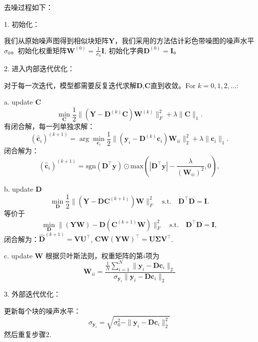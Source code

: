\documentclass[10pt,twocolumn,letterpaper]{article}
\begin{document}
去噪过程如下：

1. 初始化：

我们从原始噪声图得到相似块矩阵$\mathbf{Y}$，我们采用\cite{Chen2015ICCV}的方法估计彩色带噪图的噪声水平$\sigma_{0}$。初始化权重矩阵$\mathbf{W}^{(0)}=\frac{1}{\sigma_{0}}\mathbf{I}$, 初始化字典$\mathbf{D}^{(0)}=\mathbf{I}$。

2. 进入内部迭代优化：

对于每一次迭代，模型都需要反复迭代求解$\mathbf{D}$,$\mathbf{C}$直到收敛。For $k=0,1,2,...$:

a. update $\mathbf{C}$
\begin{equation}
\min_{\mathbf{C}}\frac{1}{2}\|(\mathbf{Y}-\mathbf{D}^{(k)}\mathbf{C})\mathbf{W}^{(k)}\|_{F}^{2}
+
\lambda\|\mathbf{C}\|_{1}.
\end{equation}
有闭合解，每一列单独求解：
\begin{equation}
(\hat{\mathbf{c}}_{i})^{(k+1)}
=
\arg\min_{\mathbf{c}_{i}}\frac{1}{2}\|(\mathbf{y}_{i}-\mathbf{D}^{(k)}\mathbf{c}_{i})\mathbf{W}_{ii}\|_{2}^{2}
+
\lambda\|\mathbf{c}_{i}\|_{1}.
\end{equation}
闭合解为：
\begin{equation}
(\hat{\mathbf{c}}_{i})^{(k+1)}
=
\text{sgn}(\mathbf{D^{\top}y}) 
\odot 
\text{max}(|\mathbf{D^{\top}y}|-\frac{\lambda}{(\mathbf{W}_{ii})^{2}},0),
\end{equation}

b. update $\mathbf{D}$
\begin{equation}
\min_{\mathbf{D}}\frac{1}{2}\|(\mathbf{Y}-\mathbf{D}\mathbf{C}^{(k+1)})\mathbf{W}\|_{F}^{2}
\quad
\text{s.t.}
\quad
\mathbf{D}^{\top}\mathbf{D} =\mathbf{I}. 
\end{equation}
等价于
\begin{equation}
\min_{\mathbf{D}}\|(\mathbf{Y}\mathbf{W})-\mathbf{D}(\mathbf{C}^{(k+1)}\mathbf{W})\|_{F}^{2}
\quad
\text{s.t.}
\quad
\mathbf{D}^{\top}\mathbf{D} = \mathbf{I},
\end{equation}
闭合解为：$\hat{\mathbf{D}}^{(k+1)}=\mathbf{V}\mathbf{U}^{\top}$, $\mathbf{C}\mathbf{W}(\mathbf{Y}\mathbf{W})^{\top}=\mathbf{U}\mathbf{\Sigma}\mathbf{V}^{\top}$.

c. update $\mathbf{W}$
根据贝叶斯法则，权重矩阵的第$i$项为
\begin{equation}
\mathbf{W}_{ii} 
=\frac{\frac{1}{N}\sum_{i=1}^{N}\|\mathbf{y}_{i}-\mathbf{D}\mathbf{c}_{i}\|_{2}}{\sigma_{\mathbf{y}_{i}}\|\mathbf{y}_{i}-\mathbf{D}\mathbf{c}_{i}\|_{2}}
\end{equation}


3. 外部迭代优化：

更新每个块的噪声水平：
\begin{equation}
\sigma_{\mathbf{y}_{i}} = \sqrt{\sigma_{0}^{2} - \|\mathbf{y}_{i}-\mathbf{D}\mathbf{c}_{i}\|_{2}^{2}}
\end{equation}
然后重复步骤2.


{
\small


}
\end{document}
